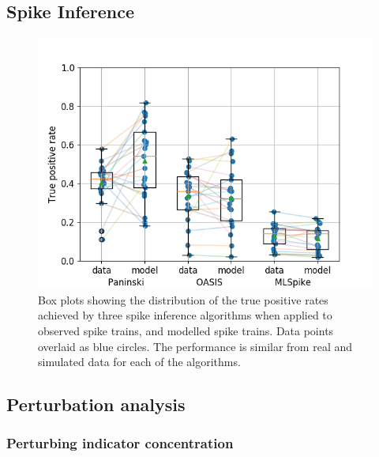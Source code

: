 \documentclass[a4paper,12pt]{article}
\theoremstyle{definition}
\begin{document}
\subsection{Spike Inference}

\begin{figure}
  \includegraphics[width=\textwidth]{figures/three_algo_comparison_tp_paper.png}
  \caption{Box plots showing the distribution of the true positive rates achieved by three spike inference algorithms when applied to observed spike trains, and modelled spike trains. Data points overlaid as blue circles. The performance is similar from real and simulated data for each of the algorithms.}
  \label{fig:three_algo_comparison}
\end{figure}

\subsection{Perturbation analysis}

\subsubsection{Perturbing indicator concentration}
\end{document}
